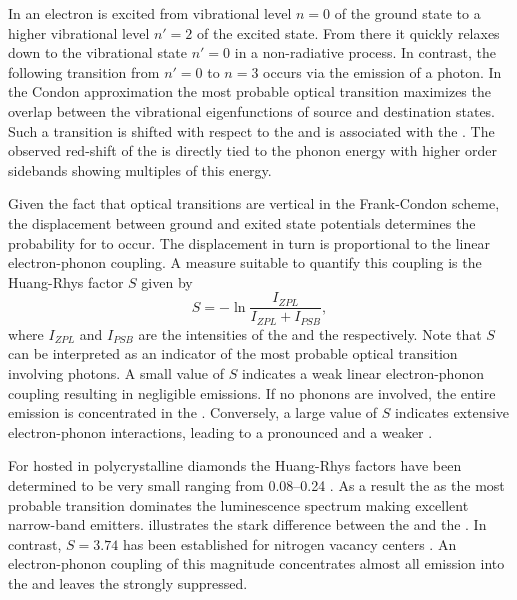     In  an electron is excited from vibrational level $n=0$ of the ground state to a higher vibrational level $n'= 2$ of the excited state. From there it quickly relaxes down to the vibrational state $n' = 0$ in a non-radiative process. In contrast, the following transition from $n'=0$ to $n=3$ occurs via the emission of a photon. In the Condon approximation the most probable optical transition maximizes the overlap between the vibrational eigenfunctions of source and destination states. Such a transition is shifted with respect to the \ZPL and is associated with the \psb. The observed red-shift of the \psb is directly tied to the phonon energy with higher order sidebands showing multiples of this energy.

    Given the fact that optical transitions are vertical in the Frank-Condon scheme, the displacement between ground and exited state potentials determines the probability for \psbs to occur. The displacement in turn is proportional to the linear electron-phonon coupling. A measure suitable to quantify this coupling is the Huang-Rhys factor $S$ given by
     \begin{equation}
        S = -\ln{\frac{I_{ZPL}}{I_{ZPL} + I_{PSB}}} ,
     \end{equation}
    where $I_{ZPL}$ and $I_{PSB}$ are the intensities of the \ZPL and the \psb respectively. Note that $S$ can be interpreted as an indicator of the most probable optical transition involving photons. A small value of $S$ indicates a weak linear electron-phonon coupling resulting in negligible \psb emissions. If no phonons are involved, the entire emission is concentrated in the \zpl. Conversely, a large value of $S$ indicates extensive electron-phonon interactions, leading to a pronounced \psb and a weaker \zpl.

    For \sivs hosted in polycrystalline diamonds the Huang-Rhys factors have been determined to be very small ranging from \SIrange{0.08}{0.24}{} \cite{Duligall2006,Yuan2002,Nothaft2012}. As a result the \zpl as the most probable transition dominates the luminescence spectrum making \sivs excellent narrow-band emitters.  illustrates the stark difference between the \zpl and the \psb. In contrast, $S=3.74$ has been established for nitrogen vacancy centers \cite{Davies1981}. An electron-phonon coupling of this magnitude concentrates almost all emission into the \psb and leaves the \zpl strongly suppressed.

